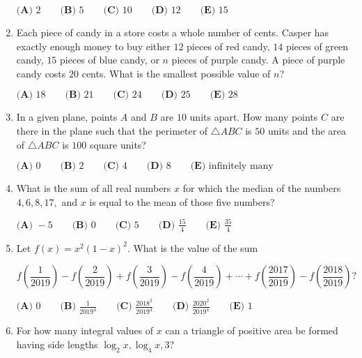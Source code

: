\documentclass{article}
\begin{document}
\begin{enumerate}[label=\arabic*., itemsep=0.5em]
$\textbf{(A) } 2 \qquad \textbf{(B) } 5 \qquad \textbf{(C) } 10\qquad \textbf{(D) } 12 \qquad \textbf{(E) } 15$\par \vspace{0.5em}\item Each piece of candy in a store costs a whole number of cents. Casper has exactly enough money to buy either $12$ pieces of red candy, $14$ pieces of green candy, $15$ pieces of blue candy, or $n$ pieces of purple candy. A piece of purple candy costs $20$ cents. What is the smallest possible value of $n$?

$\textbf{(A) } 18 \qquad \textbf{(B) } 21 \qquad \textbf{(C) } 24\qquad \textbf{(D) } 25 \qquad \textbf{(E) } 28$\par \vspace{0.5em}\item In a given plane, points $A$ and $B$ are $10$ units apart. How many points $C$ are there in the plane such that the perimeter of $\triangle ABC$ is $50$ units and the area of $\triangle ABC$ is $100$ square units?

$\textbf{(A) }0\qquad\textbf{(B) }2\qquad\textbf{(C) }4\qquad\textbf{(D) }8\qquad\textbf{(E) }\text{infinitely many}$\par \vspace{0.5em}\item What is the sum of all real numbers $x$ for which the median of the numbers $4,6,8,17,$ and $x$ is equal to the mean of those five numbers?

$\textbf{(A) } -5 \qquad\textbf{(B) } 0 \qquad\textbf{(C) } 5 \qquad\textbf{(D) } \frac{15}{4} \qquad\textbf{(E) } \frac{35}{4}$\par \vspace{0.5em}\item Let $f(x) = x^{2}(1-x)^{2}$. What is the value of the sum


\begin{equation*}
f \left(\frac{1}{2019} \right)-f  \left(\frac{2}{2019} \right)+f \left(\frac{3}{2019} \right)-f \left(\frac{4}{2019} \right)+\cdots + f \left(\frac{2017}{2019} \right) - f \left(\frac{2018}{2019} \right)?
\end{equation*}


$\textbf{(A) }0\qquad\textbf{(B) }\frac{1}{2019^{4}}\qquad\textbf{(C) }\frac{2018^{2}}{2019^{4}}\qquad\textbf{(D) }\frac{2020^{2}}{2019^{4}}\qquad\textbf{(E) }1$\par \vspace{0.5em}\item For how many integral values of $x$ can a triangle of positive area be formed having side lengths $
\log_{2} x, \log_{4} x, 3$?


\end{enumerate}
\end{document}
